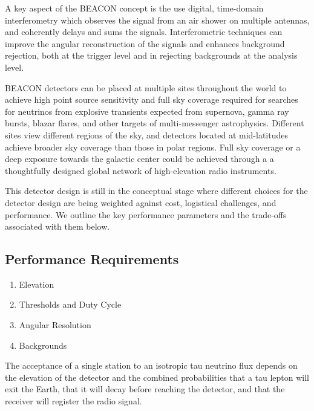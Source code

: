 \documentclass[12pt]{article}
\begin{document}
A key aspect of the BEACON concept is the use digital, time-domain interferometry which observes the signal from an air shower on multiple antennas, and coherently delays and sums the signals. Interferometric techniques can improve the angular reconstruction of the signals and enhances background rejection, both at the trigger level and in rejecting backgrounds at the analysis level. 

BEACON detectors can be placed at multiple sites throughout the world to achieve high point source sensitivity and full sky coverage required for searches for neutrinos from explosive transients expected from supernova, gamma ray bursts, blazar flares, and other targets of multi-messenger astrophysics. Different sites view different regions of the sky, and detectors located at mid-latitudes achieve broader sky coverage than those in polar regions. Full sky coverage or a deep exposure towards the galactic center could be achieved through a a thoughtfully designed global network of high-elevation radio instruments. 

This detector design is still in the conceptual stage where different choices for the detector design are being weighted against cost, logistical challenges, and performance. We outline the key performance parameters and the trade-offs associated with them below.

\subsection{Performance Requirements}
\begin{enumerate}
\item Elevation
\item Thresholds and Duty Cycle
\item Angular Resolution
\item Backgrounds
\end{enumerate}

The acceptance of a single station to an isotropic tau neutrino flux depends on the elevation of the detector and the combined probabilities that a tau lepton will exit the Earth, that it will decay before reaching the detector, and that the receiver will register the radio signal. 
\end{document}
